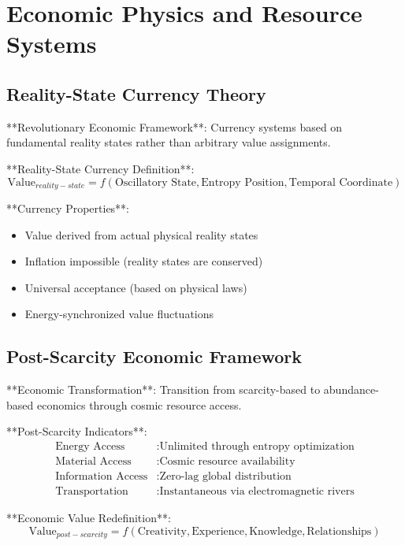 \documentclass[12pt,a4paper]{article}
\theoremstyle{remark}
\begin{document}
\section{Economic Physics and Resource Systems}

\subsection{Reality-State Currency Theory}

**Revolutionary Economic Framework**: Currency systems based on fundamental reality states rather than arbitrary value assignments.

**Reality-State Currency Definition**:
\begin{equation}
\text{Value}_{reality-state} = f(\text{Oscillatory State}, \text{Entropy Position}, \text{Temporal Coordinate})
\end{equation}

**Currency Properties**:
\begin{itemize}
\item Value derived from actual physical reality states
\item Inflation impossible (reality states are conserved)
\item Universal acceptance (based on physical laws)
\item Energy-synchronized value fluctuations
\end{itemize}

\subsection{Post-Scarcity Economic Framework}

**Economic Transformation**: Transition from scarcity-based to abundance-based economics through cosmic resource access.

**Post-Scarcity Indicators**:
\begin{align}
\text{Energy Access} &: \text{Unlimited through entropy optimization} \\
\text{Material Access} &: \text{Cosmic resource availability} \\
\text{Information Access} &: \text{Zero-lag global distribution} \\
\text{Transportation} &: \text{Instantaneous via electromagnetic rivers}
\end{align}

**Economic Value Redefinition**:
\begin{equation}
\text{Value}_{post-scarcity} = f(\text{Creativity}, \text{Experience}, \text{Knowledge}, \text{Relationships})
\end{equation}
\end{document}
